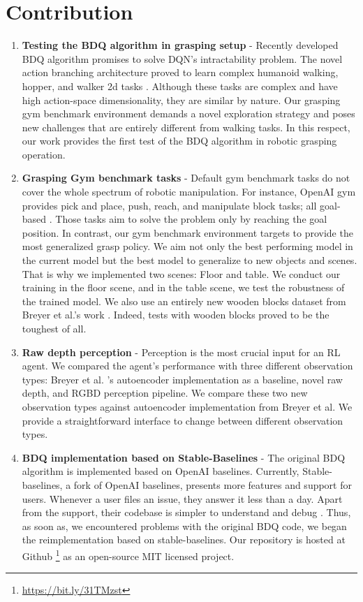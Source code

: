 \section{Contribution}

\begin{enumerate}
    \item \textbf{Testing the BDQ algorithm in grasping setup} - Recently developed BDQ algorithm promises to solve DQN's intractability problem. The novel action branching architecture proved to learn complex humanoid walking, hopper, and walker 2d tasks \cite{Tavakoli2018}. Although these tasks are complex and have high action-space dimensionality, they are similar by nature. Our grasping gym benchmark environment demands a novel exploration strategy and poses new challenges that are entirely different from walking tasks. In this respect, our work provides the first test of the BDQ algorithm in robotic grasping operation.

    \item \textbf{Grasping Gym benchmark tasks} - Default gym benchmark tasks do not cover the whole spectrum of robotic manipulation. For instance, OpenAI gym provides pick and place, push, reach, and manipulate block tasks; all goal-based \cite{OpenAIgym}. Those tasks aim to solve the problem only by reaching the goal position. In contrast, our gym benchmark environment targets to provide the most generalized grasp policy. We aim not only the best performing model in the current model but the best model to generalize to new objects and scenes. That is why we implemented two scenes: Floor and table. We conduct our training in the floor scene, and in the table scene, we test the robustness of the trained model. We also use an entirely new wooden blocks dataset from Breyer et al.'s work \cite{Breyer2018}. Indeed, tests with wooden blocks proved to be the toughest of all. 

    \item \textbf{Raw depth perception} - Perception is the most crucial input for an RL agent. We compared the agent's performance with three different observation types: Breyer et al. 's autoencoder implementation as a baseline, novel raw depth, and RGBD perception pipeline. We compare these two new observation types against autoencoder implementation from Breyer et al. We provide a straightforward interface to change between different observation types.

    \item \textbf{BDQ implementation based on Stable-Baselines} - The original BDQ algorithm is implemented based on OpenAI baselines. Currently, Stable-baselines, a fork of OpenAI baselines, presents more features and support for users. Whenever a user files an issue, they answer it less than a day. Apart from the support, their codebase is simpler to understand and debug \cite{stable-baselines}. Thus, as soon as, we encountered problems with the original BDQ code, we began the reimplementation based on stable-baselines. Our repository is hosted at Github \footnote{\url{https://bit.ly/31TMzst}} as an open-source MIT licensed project.


\end{enumerate}
